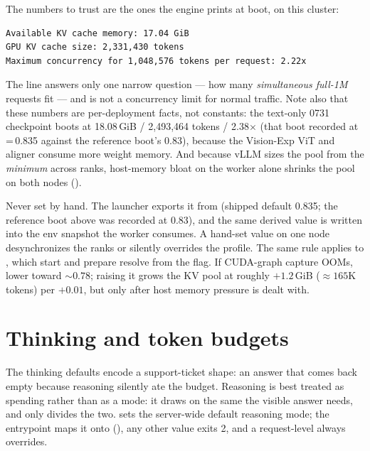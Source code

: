 The numbers to trust are the ones the engine prints at boot, on this cluster:

\begin{lstlisting}
Available KV cache memory: 17.04 GiB
GPU KV cache size: 2,331,430 tokens
Maximum concurrency for 1,048,576 tokens per request: 2.22x
\end{lstlisting}

The  line answers only one narrow question --- how many
\emph{simultaneous full-1M} requests fit --- and is not a concurrency limit
for normal traffic. Note also that these numbers are per-deployment facts, not
constants: the text-only 0731 checkpoint boots at 18.08\,GiB /
2{,}493{,}464 tokens / 2.38$\times$ (that boot recorded at
\,=\,0.835 against the reference boot's
0.83), because the Vision-Exp ViT and aligner consume more weight memory. And because vLLM sizes
the pool from the \emph{minimum} across ranks, host-memory bloat on the worker
alone shrinks the pool on both nodes ().

\begin{hbwarning}
Never set  by hand. The launcher exports it
from  (shipped default 0.835; the
reference boot above was recorded at 0.83), and the same derived value is
written into the env snapshot the worker consumes. A hand-set value on one
node desynchronizes the ranks or silently overrides the profile. The same
rule applies to , which start and prepare resolve from
the  flag. If CUDA-graph capture OOMs, lower
 toward ${\sim}0.78$; raising it grows
the KV pool at roughly $+1.2$\,GiB (${\approx}165$K tokens) per $+0.01$, but
only after host memory pressure is dealt with.
\end{hbwarning}

\section{Thinking and token budgets}
\label{sec:profile-thinking}

The thinking defaults encode a support-ticket shape: an answer that comes
back empty because reasoning silently ate the budget. Reasoning is best
treated as spending rather than as a mode: it draws on the same
 the visible answer needs, and only
 divides the two.
 sets the server-wide default reasoning mode; the
entrypoint maps it onto 
(), any other value exits 2, and a request-level
 always overrides.

